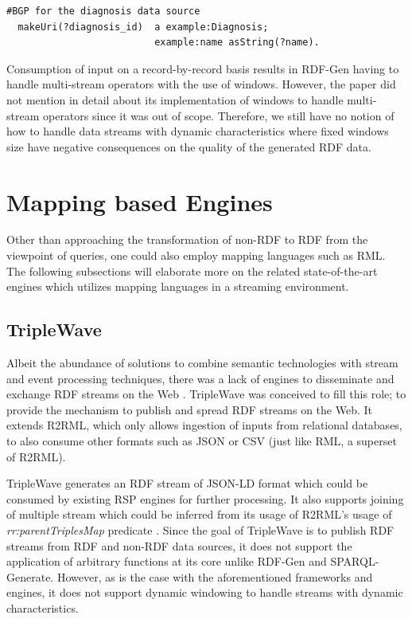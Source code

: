 \begin{lstlisting}[language={SPARQL},
   caption={A simple graph template $G$ with the functions \emph{asString} and \emph{makeUri}.}, 
   label={lst:rdf_gen_example}
  ]
  #BGP for the diagnosis data source
  makeUri(?diagnosis_id)  a example:Diagnosis;
                          example:name asString(?name).
\end{lstlisting}

Consumption of input on a record-by-record basis results in RDF-Gen having to 
handle multi-stream operators with the use of windows. However, the paper did not 
mention in detail about its implementation of windows to handle 
multi-stream operators since it was out of scope. Therefore, we still have no 
notion of how to handle data streams with dynamic characteristics where fixed windows 
size have negative consequences on the quality of the generated RDF data. 


\section{Mapping based Engines}
\label{sec:mapping_based_engine}
Other than approaching the transformation of non-RDF to RDF from the viewpoint of 
queries, one could also employ mapping languages such as RML. 
The following subsections will elaborate more on the related state-of-the-art engines 
which utilizes mapping languages in a streaming environment. 

\subsection{TripleWave}
Albeit the abundance of solutions to combine semantic technologies with stream and event processing 
techniques, there was a lack of engines to disseminate and exchange RDF streams on the Web \cite{triple_wave}. 
TripleWave\cite{triple_wave} was conceived to fill this role; to provide the mechanism to publish and spread RDF streams on the Web. 
It extends R2RML, which only allows ingestion of inputs from relational databases, 
to also consume other formats such as JSON or CSV (just like RML, a superset of R2RML). 

TripleWave generates an RDF stream of JSON-LD format which could be consumed by existing RSP engines for further 
processing. It also supports joining of multiple stream which could be inferred from its usage of R2RML's usage 
of \emph{rr:parentTriplesMap} predicate \cite{triple_wave}. Since the goal of TripleWave 
is to publish RDF streams from RDF and non-RDF data sources, it does not support the 
application of arbitrary functions at its core unlike RDF-Gen and SPARQL-Generate. 
However, as is the case with the aforementioned frameworks and engines, 
it does not support dynamic windowing to handle streams 
with dynamic characteristics. 



